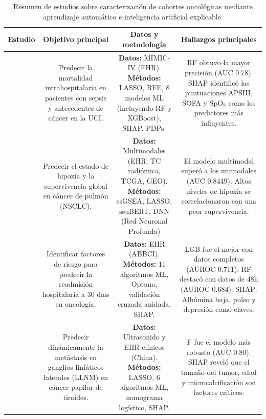 \begin{table}[p]
\centering
\scriptsize
\setlength{\tabcolsep}{2pt}
\renewcommand{\arraystretch}{1.1}
\caption{Resumen de estudios sobre caracterización de cohortes oncológicas mediante aprendizaje automático e inteligencia artificial explicable.}
\label{tab:resumen_scopus}
\begin{tabular}{|c|c|c|c|}
\hline
\parbox[t]{1.2cm}{\centering\textbf{Estudio}} & \parbox[t]{4.0cm}{\centering\textbf{Objetivo principal}} & \parbox[t]{5.0cm}{\centering\textbf{Datos y metodología}} & \parbox[t]{5.0cm}{\centering\textbf{Hallazgos principales}} \\ \hline
\parbox[t]{1.2cm}{\centering \cite{article1}} & \parbox[t]{4.0cm}{Predecir la mortalidad intrahospitalaria en pacientes con sepsis y antecedentes de cáncer en la UCI.} & \parbox[t]{5.0cm}{\textbf{Datos:} MIMIC-IV (EHR). \newline \textbf{Métodos:} LASSO, RFE, 8 modelos ML (incluyendo RF y XGBoost), SHAP, PDPs.} & \parbox[t]{5.0cm}{RF obtuvo la mayor precisión (AUC 0.78). SHAP identificó las puntuaciones APSIII, SOFA y SpO$_2$ como los predictores más influyentes.} \\ \hline
\parbox[t]{1.2cm}{\centering \cite{article2}} & \parbox[t]{4.0cm}{Predecir el estado de hipoxia y la supervivencia global en cáncer de pulmón (NSCLC).} & \parbox[t]{5.0cm}{\textbf{Datos:} Multimodales (EHR, TC radiómica, TCGA, GEO). \newline \textbf{Métodos:} ssGSEA, LASSO, ssuBERT, DNN (Red Neuronal Profunda)} & \parbox[t]{5.0cm}{El modelo multimodal superó a los unimodales (AUC 0.8449). Altos niveles de hipoxia se correlacionaron con una peor supervivencia.} \\ \hline
\parbox[t]{1.2cm}{\centering \cite{article3}} & \parbox[t]{4.0cm}{Identificar factores de riesgo para predecir la readmisión hospitalaria a 30 días en oncología.} & \parbox[t]{5.0cm}{\textbf{Datos:} EHR (ABBCI). \newline \textbf{Métodos:} 11 algoritmos ML, Optuna, validación cruzada anidada, SHAP.} & \parbox[t]{5.0cm}{LGB fue el mejor con datos completos (AUROC 0.711); RF destacó con datos de 48h (AUROC 0.684). SHAP: Albúmina baja, pulso y depresión como claves.} \\ \hline
\parbox[t]{1.2cm}{\centering \cite{article4}} & \parbox[t]{4.0cm}{Predecir dinámicamente la metástasis en ganglios linfáticos laterales (LLNM) en cáncer papilar de tiroides.} & \parbox[t]{5.0cm}{\textbf{Datos:} Ultrasonido y EHR clínicos (China). \newline \textbf{Métodos:} LASSO, 6 algoritmos ML, nomograma logístico, SHAP. } & \parbox[t]{5.0cm}{F fue el modelo más robusto (AUC 0.80). SHAP reveló que el tamaño del tumor, edad y microcalcificación son factores críticos.} \\ \hline

\end{tabular}
\end{table}
